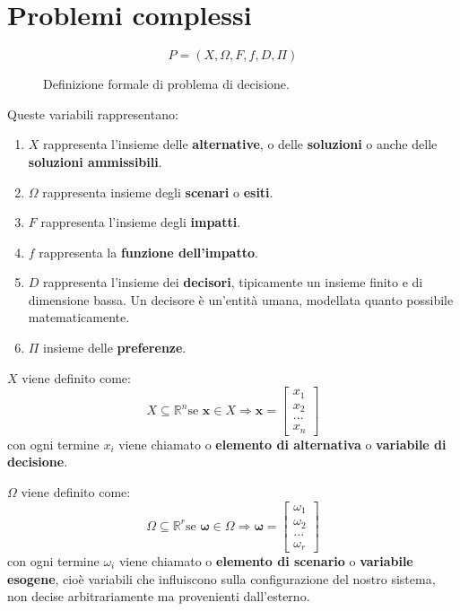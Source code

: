\documentclass[\main/main.tex]{subfiles}
\begin{document}
\section{Problemi complessi}

\begin{figure}[H]
	\[
		P = (X, \Omega, F, f, D, \Pi)
	\]
	\caption{Definizione formale di problema di decisione.}
\end{figure}

Queste variabili rappresentano:

\begin{enumerate}
	\item $X$ rappresenta l'insieme delle \textbf{alternative}, o delle \textbf{soluzioni} o anche delle \textbf{soluzioni ammissibili}.
	\item $\Omega$ rappresenta insieme degli \textbf{scenari} o \textbf{esiti}.
	\item $F$ rappresenta l'insieme degli \textbf{impatti}.
	\item $f$ rappresenta la \textbf{funzione dell'impatto}.
	\item $D$ rappresenta l'insieme dei \textbf{decisori}, tipicamente un insieme finito e di dimensione bassa. Un decisore è un'entità umana, modellata quanto possibile matematicamente.
	\item $\Pi$ insieme delle \textbf{preferenze}.
\end{enumerate}

$X$ viene definito come: \[X \subseteq \mathbb{R}^n \text{se } \bm{x} \in X \Rightarrow \bm{x} = \begin{bmatrix}x_1\\x_2\\...\\x_n \end{bmatrix}\]
con ogni termine $x_i$ viene chiamato o \textbf{elemento di alternativa} o \textbf{variabile di decisione}.

$\Omega$ viene definito come: \[\Omega \subseteq \mathbb{R}^r \text{se } \bm{\omega} \in \Omega \Rightarrow \bm{\omega} = \begin{bmatrix}\omega_1\\\omega_2\\...\\\omega_r \end{bmatrix}\]
con ogni termine $\omega_i$ viene chiamato o \textbf{elemento di scenario} o \textbf{variabile esogene}, cioè variabili che influiscono sulla configurazione del nostro sistema, non decise arbitrariamente ma provenienti dall'esterno.
\end{document}
